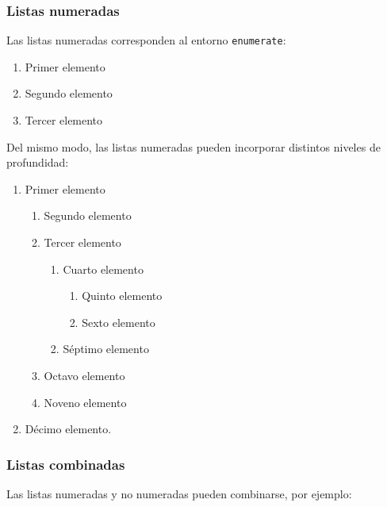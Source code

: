\subsubsection{Listas numeradas}

Las listas numeradas corresponden al entorno \texttt{enumerate}:

\begin{enumerate}
    \item Primer elemento
    \item Segundo elemento
    \item Tercer elemento
\end{enumerate}

Del mismo modo, las listas numeradas pueden incorporar distintos niveles de profundidad:

\begin{enumerate}
    \item Primer elemento
    \begin{enumerate}
        \item Segundo elemento
        \item Tercer elemento
        \begin{enumerate}
            \item Cuarto elemento
            \begin{enumerate}
                \item Quinto elemento
                \item Sexto elemento
            \end{enumerate}
            \item Séptimo elemento
        \end{enumerate}
        \item Octavo elemento
        \item Noveno elemento
    \end{enumerate}
    \item Décimo elemento.
\end{enumerate}


\subsubsection{Listas combinadas}

Las listas numeradas y no numeradas pueden combinarse, por ejemplo:

